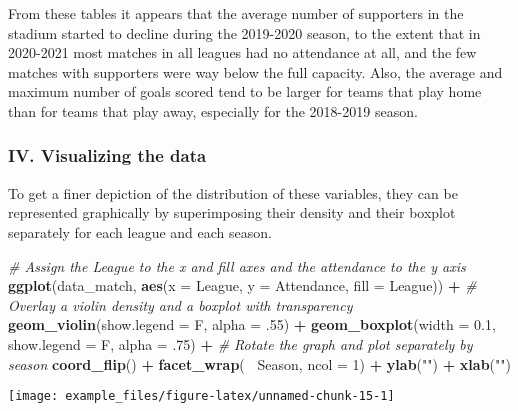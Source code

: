 \documentclass[
]{article}
\newenvironment{Shaded}{\begin{snugshade}}{\end{snugshade}}
\newcommand{\CommentTok}[1]{\textcolor[rgb]{0.56,0.35,0.01}{\textit{#1}}}
\newcommand{\DataTypeTok}[1]{\textcolor[rgb]{0.13,0.29,0.53}{#1}}
\newcommand{\DecValTok}[1]{\textcolor[rgb]{0.00,0.00,0.81}{#1}}
\newcommand{\FloatTok}[1]{\textcolor[rgb]{0.00,0.00,0.81}{#1}}
\newcommand{\KeywordTok}[1]{\textcolor[rgb]{0.13,0.29,0.53}{\textbf{#1}}}
\newcommand{\NormalTok}[1]{#1}
\newcommand{\OperatorTok}[1]{\textcolor[rgb]{0.81,0.36,0.00}{\textbf{#1}}}
\newcommand{\StringTok}[1]{\textcolor[rgb]{0.31,0.60,0.02}{#1}}
\begin{document}
From these tables it appears that the average number of supporters in
the stadium started to decline during the 2019-2020 season, to the
extent that in 2020-2021 most matches in all leagues had no attendance
at all, and the few matches with supporters were way below the full
capacity. Also, the average and maximum number of goals scored tend to
be larger for teams that play home than for teams that play away,
especially for the 2018-2019 season.

\hypertarget{iv.-visualizing-the-data}{%
\subsubsection{IV. Visualizing the
data}\label{iv.-visualizing-the-data}}

To get a finer depiction of the distribution of these variables, they
can be represented graphically by superimposing their density and their
boxplot separately for each league and each season.

\begin{Shaded}
\begin{Highlighting}[]
\CommentTok{# Assign the League to the x and fill axes and the attendance to the y axis}
\KeywordTok{ggplot}\NormalTok{(data_match, }\KeywordTok{aes}\NormalTok{(}\DataTypeTok{x =}\NormalTok{ League, }\DataTypeTok{y =}\NormalTok{ Attendance, }\DataTypeTok{fill =}\NormalTok{ League)) }\OperatorTok{+}
\StringTok{  }\CommentTok{# Overlay a violin density and a boxplot with transparency}
\StringTok{  }\KeywordTok{geom_violin}\NormalTok{(}\DataTypeTok{show.legend =}\NormalTok{ F, }\DataTypeTok{alpha =} \FloatTok{.55}\NormalTok{) }\OperatorTok{+}
\StringTok{  }\KeywordTok{geom_boxplot}\NormalTok{(}\DataTypeTok{width =} \FloatTok{0.1}\NormalTok{, }\DataTypeTok{show.legend =}\NormalTok{ F, }\DataTypeTok{alpha =} \FloatTok{.75}\NormalTok{) }\OperatorTok{+}\StringTok{ }
\StringTok{  }\CommentTok{# Rotate the graph and plot separately by season}
\StringTok{  }\KeywordTok{coord_flip}\NormalTok{() }\OperatorTok{+}\StringTok{ }\KeywordTok{facet_wrap}\NormalTok{(}\OperatorTok{~}\StringTok{ }\NormalTok{Season, }\DataTypeTok{ncol =} \DecValTok{1}\NormalTok{) }\OperatorTok{+}\StringTok{ }\KeywordTok{ylab}\NormalTok{(}\StringTok{""}\NormalTok{) }\OperatorTok{+}\StringTok{ }\KeywordTok{xlab}\NormalTok{(}\StringTok{""}\NormalTok{)}
\end{Highlighting}
\end{Shaded}

\begin{center}\texttt{[image: example\_files/figure-latex/unnamed-chunk-15-1]} \end{center}
\end{document}
